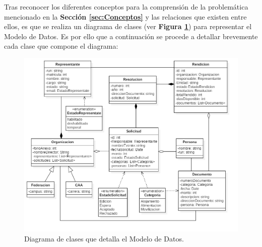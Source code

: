Tras reconocer los diferentes conceptos para la comprensión de la problemática mencionado en la \textbf{Sección \ref{sec:Conceptos}} y las relaciones que existen entre ellos, es que se realiza un diagrama de clases (ver \textbf{Figura \ref{fig: Diagrama_Clases}}) para representar el Modelo de Datos. Es por ello que a continuación se procede a detallar brevemente cada clase que compone el diagrama:

\begin{figure}[htb]
    \includegraphics[width=\textwidth]{Imagenes/Diagrama_general_clases.png}
    \caption{\label{fig: Diagrama_Clases}Diagrama de clases que detalla el Modelo de Datos.}
\end{figure}

